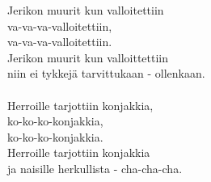 
Jerikon muurit kun valloitettiin \\ va-va-va-valloitettiin, \\ va-va-va-valloitettiin. \\ Jerikon muurit kun valloittettiin \\ niin ei tykkejä tarvittukaan - ollenkaan. \\ \hspace{10mm} \\ Herroille tarjottiin konjakkia, \\ ko-ko-ko-konjakkia, \\ ko-ko-ko-konjakkia. \\ Herroille tarjottiin konjakkia \\ ja naisille herkullista - cha-cha-cha.